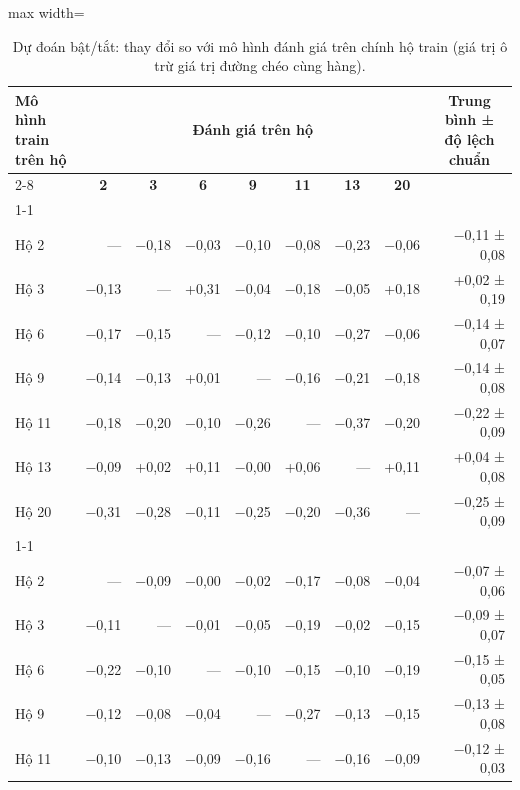 \begin{table}[H]
\centering
\caption{Dự đoán bật/tắt: thay đổi so với mô hình đánh giá trên chính hộ train (giá trị ô trừ giá trị đường chéo cùng hàng).}\label{nilm:tab11}
\footnotesize
\setlength{\tabcolsep}{3.5pt}\renewcommand{\arraystretch}{1.12}
\begin{adjustbox}{max width=\linewidth}
\begin{tabular}{|l|r|r|r|r|r|r|r|r|}
\hline
\multirow{2}{*}{\textbf{Mô hình train trên hộ}} & \multicolumn{7}{c|}{\textbf{Đánh giá trên hộ}} & \multicolumn{1}{c|}{\multirow{2}{*}{\textbf{Trung bình ± độ lệch chuẩn}}} \\ \cline{2-8}
 & \multicolumn{1}{c|}{\textbf{2}} & \multicolumn{1}{c|}{\textbf{3}} & \multicolumn{1}{c|}{\textbf{6}} & \multicolumn{1}{c|}{\textbf{9}} & \multicolumn{1}{c|}{\textbf{11}} & \multicolumn{1}{c|}{\textbf{13}} & \multicolumn{1}{c|}{\textbf{20}} \\ \cline{1-1}
\multicolumn{9}{|l|}{\textbf{Precision ↑}} \\ \hline
Hộ 2 & — & −0,18 & −0,03 & −0,10 & −0,08 & −0,23 & −0,06 & −0,11 ± 0,08 \\ \hline
Hộ 3 & −0,13 & — & +0,31 & −0,04 & −0,18 & −0,05 & +0,18 & +0,02 ± 0,19 \\ \hline
Hộ 6 & −0,17 & −0,15 & — & −0,12 & −0,10 & −0,27 & −0,06 & −0,14 ± 0,07 \\ \hline
Hộ 9 & −0,14 & −0,13 & +0,01 & — & −0,16 & −0,21 & −0,18 & −0,14 ± 0,08 \\ \hline
Hộ 11 & −0,18 & −0,20 & −0,10 & −0,26 & — & −0,37 & −0,20 & −0,22 ± 0,09 \\ \hline
Hộ 13 & −0,09 & +0,02 & +0,11 & −0,00 & +0,06 & — & +0,11 & +0,04 ± 0,08 \\ \hline
Hộ 20 & −0,31 & −0,28 & −0,11 & −0,25 & −0,20 & −0,36 & — & −0,25 ± 0,09 \\ \cline{1-1}
\multicolumn{9}{|l|}{\textbf{Recall ↑}} \\ \hline
Hộ 2 & — & −0,09 & −0,00 & −0,02 & −0,17 & −0,08 & −0,04 & −0,07 ± 0,06 \\ \hline
Hộ 3 & −0,11 & — & −0,01 & −0,05 & −0,19 & −0,02 & −0,15 & −0,09 ± 0,07 \\ \hline
Hộ 6 & −0,22 & −0,10 & — & −0,10 & −0,15 & −0,10 & −0,19 & −0,15 ± 0,05 \\ \hline
Hộ 9 & −0,12 & −0,08 & −0,04 & — & −0,27 & −0,13 & −0,15 & −0,13 ± 0,08 \\ \hline
Hộ 11 & −0,10 & −0,13 & −0,09 & −0,16 & — & −0,16 & −0,09 & −0,12 ± 0,03 \\ \hline

\end{tabular}
\end{adjustbox}
\end{table}
